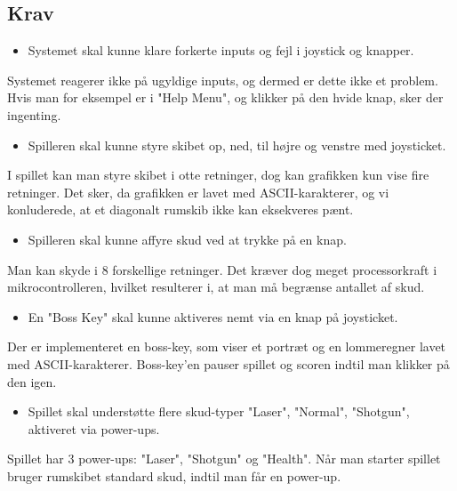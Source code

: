 \subsection{Krav}
\begin{itemize}
    \item Systemet skal kunne klare forkerte inputs og fejl i joystick og knapper.
\end{itemize}
Systemet reagerer ikke på ugyldige inputs, og dermed er dette ikke et problem. Hvis man for eksempel er i "Help Menu", og klikker på den hvide knap, sker der ingenting.

\begin{itemize}
    \item Spilleren skal kunne styre skibet op, ned, til højre og venstre med joysticket.
\end{itemize}
I spillet kan man styre skibet i otte retninger, dog kan grafikken kun vise fire retninger. Det sker, da grafikken er lavet med ASCII-karakterer, og vi konluderede, at et diagonalt rumskib ikke kan eksekveres pænt.

\begin{itemize}
    \item Spilleren skal kunne affyre skud ved at trykke på en knap.
\end{itemize}
Man kan skyde i 8 forskellige retninger. Det kræver dog meget processorkraft i mikrocontrolleren, hvilket resulterer i, at man må begrænse antallet af skud.

\begin{itemize}
    \item En "Boss Key" skal kunne aktiveres nemt via en knap på joysticket.
\end{itemize}
Der er implementeret en boss-key, som viser et portræt og en lommeregner lavet med ASCII-karakterer. Boss-key'en pauser spillet og scoren indtil man klikker på den igen.

\begin{itemize}
    \item Spillet skal understøtte flere skud-typer "Laser", "Normal", "Shotgun", aktiveret via power-ups.
\end{itemize}
Spillet har 3 power-ups: "Laser", "Shotgun" og "Health". Når man starter spillet bruger rumskibet standard skud, indtil man får en power-up.

